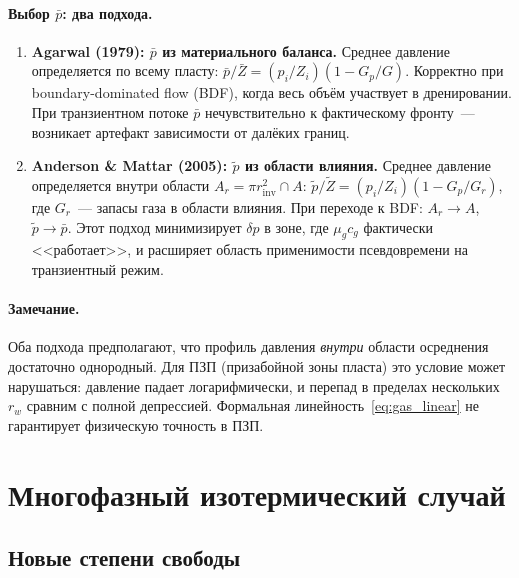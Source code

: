 \documentclass[12pt,a4paper]{article}
\begin{document}
\paragraph{Выбор $\bar{p}$: два подхода.}

\begin{enumerate}
  \item \textbf{Agarwal (1979): $\bar{p}$ из материального баланса.}
        Среднее давление определяется по всему пласту:
        $\bar{p}/\bar{Z} = (p_i/Z_i)(1 - G_p/G)$.
        Корректно при boundary-dominated flow (BDF),
        когда весь объём участвует в дренировании.
        При транзиентном потоке $\bar{p}$ нечувствительно
        к фактическому фронту~--- возникает артефакт
        зависимости от далёких границ.

  \item \textbf{Anderson \& Mattar (2005): $\tilde{p}$ из области влияния.}
        Среднее давление определяется внутри области
        $A_r = \pi r_{\mathrm{inv}}^2 \cap A$:
        $\tilde{p}/\tilde{Z} = (p_i/Z_i)(1 - G_p/G_r)$,
        где $G_r$~--- запасы газа в области влияния.
        При переходе к BDF: $A_r \to A$, $\tilde{p} \to \bar{p}$.
        Этот подход минимизирует $\delta p$ в зоне,
        где $\mu_g c_g$ фактически <<работает>>, и
        расширяет область применимости псевдовремени
        на транзиентный режим.
\end{enumerate}

\paragraph{Замечание.}
Оба подхода предполагают, что профиль давления
\emph{внутри} области осреднения достаточно однородный.
Для ПЗП (призабойной зоны пласта) это условие
может нарушаться: давление падает логарифмически,
и перепад в пределах нескольких $r_w$ сравним
с полной депрессией. Формальная линейность~\eqref{eq:gas_linear}
не гарантирует физическую точность в ПЗП.


\section{Многофазный изотермический случай}\label{sec:multi}

\subsection{Новые степени свободы}
\end{document}
